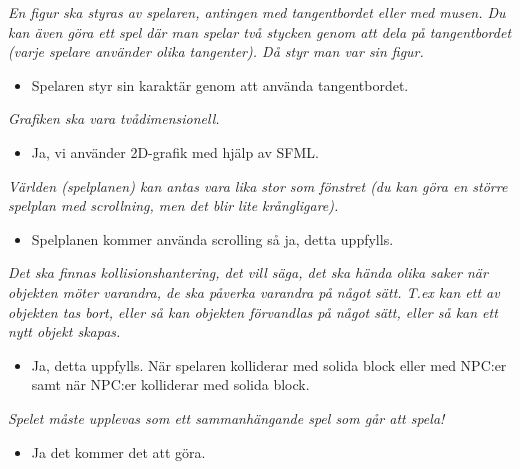 \documentclass{TDP003mall}
\begin{document}
\noindent\textit{En figur ska styras av spelaren, antingen med tangentbordet eller med musen. Du kan även göra ett spel där
man spelar två stycken genom att dela på tangentbordet (varje spelare använder olika tangenter). Då styr
man var sin figur.}
\begin{itemize}
\item Spelaren styr sin karaktär genom att använda tangentbordet.
\end{itemize}

\noindent\textit{Grafiken ska vara tvådimensionell.}
\begin{itemize}
\item Ja, vi använder 2D-grafik med hjälp av SFML.
\end{itemize}

\noindent\textit{Världen (spelplanen) kan antas vara lika stor som fönstret (du kan göra en större spelplan med scrollning,
men det blir lite krångligare).}
\begin{itemize}
\item Spelplanen kommer använda scrolling så ja, detta uppfylls.
\end{itemize}

\textit{Det ska finnas kollisionshantering, det vill säga, det ska hända olika saker när objekten möter varandra, 
de ska påverka varandra på något sätt. T.ex kan ett av objekten tas bort, eller så kan objekten förvandlas på
något sätt, eller så kan ett nytt objekt skapas.}
\begin{itemize}
\item Ja, detta uppfylls. När spelaren kolliderar med solida block eller med NPC:er samt när NPC:er kolliderar med solida block.
\end{itemize}

\noindent\textit{Spelet måste upplevas som ett sammanhängande spel som går att spela!}
\begin{itemize}
\item Ja det kommer det att göra.
\end{itemize}
\end{document}
